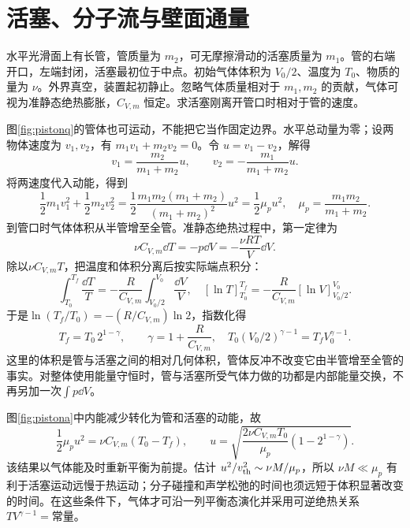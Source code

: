 \section{活塞、分子流与壁面通量}
\begin{example}[自由管与活塞的相对速度]\label{ex:piston}
水平光滑面上有长管，管质量为 $m_2$，可无摩擦滑动的活塞质量为 $m_1$。管的右端开口，左端封闭，活塞最初位于中点。初始气体体积为 $V_0/2$、温度为 $T_0$、物质的量为 $\nu$。外界真空，装置起初静止。忽略气体质量相对于 $m_1,m_2$ 的贡献，气体可视为准静态绝热膨胀，$C_{V,m}$ 恒定。求活塞刚离开管口时相对于管的速度。
\end{example}
\begin{solution}
图\ref{fig:pistonq}的管体也可运动，不能把它当作固定边界。水平总动量为零；设两物体速度为 $v_1,v_2$，有 $m_1v_1+m_2v_2=0$。令 $u=v_1-v_2$，解得
\[
 v_1=\frac{m_2}{m_1+m_2}u,\qquad v_2=-\frac{m_1}{m_1+m_2}u.
\]
将两速度代入动能，得到
\[
 \frac12m_1v_1^2+\frac12m_2v_2^2
 =\frac12\frac{m_1m_2(m_1+m_2)}{(m_1+m_2)^2}u^2
 =\frac12\mu_pu^2,
 \quad \mu_p=\frac{m_1m_2}{m_1+m_2}.
\]
到管口时气体体积从半管增至全管。准静态绝热过程中，第一定律为
\[
 \nu C_{V,m}\dd T=-p\dd V
 =-\frac{\nu RT}{V}\dd V.
\]
除以$\nu C_{V,m}T$，把温度和体积分离后按实际端点积分：
\[
 \int_{T_0}^{T_f}\frac{\dd T}{T}
 =-\frac R{C_{V,m}}\int_{V_0/2}^{V_0}\frac{\dd V}{V},
 \quad [\ln T]_{T_0}^{T_f}
 =-\frac R{C_{V,m}}[\ln V]_{V_0/2}^{V_0}.
\]
于是$\ln(T_f/T_0)=-(R/C_{V,m})\ln2$，指数化得
\[
 T_f=T_0\,2^{1-\gamma},\qquad\gamma=1+\frac R{C_{V,m}},
 \quad T_0(V_0/2)^{\gamma-1}=T_fV_0^{\gamma-1}.
\]
这里的体积是管与活塞之间的相对几何体积，管体反冲不改变它由半管增至全管的事实。对整体使用能量守恒时，管与活塞所受气体力做的功都是内部能量交换，不再另加一次$\int p\dd V$。

图\ref{fig:pistona}中内能减少转化为管和活塞的动能，故
\[
 \frac12\mu_pu^2=\nu C_{V,m}(T_0-T_f),\qquad
 u=\sqrt{\frac{2\nu C_{V,m}T_0}{\mu_p}(1-2^{1-\gamma})}.
\]
该结果以气体能及时重新平衡为前提。估计 $u^2/v_{\rm th}^2\sim\nu M/\mu_p$，所以 $\nu M\ll\mu_p$ 有利于活塞运动远慢于热运动；分子碰撞和声学松弛的时间也须远短于体积显著改变的时间。在这些条件下，气体才可沿一列平衡态演化并采用可逆绝热关系 $TV^{\gamma-1}=\text{常量}$。
\end{solution}


